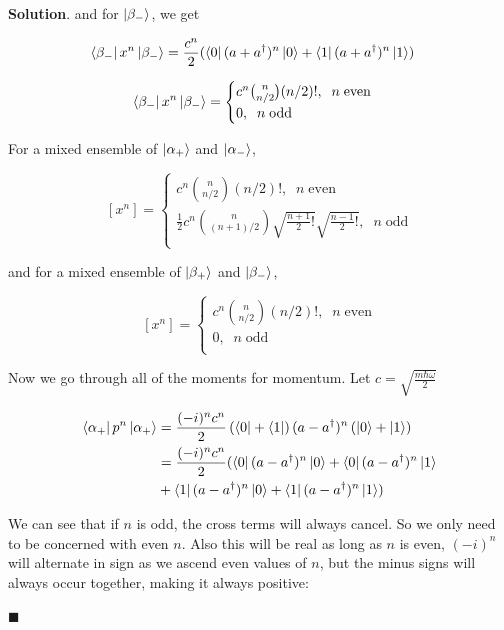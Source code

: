 \documentclass[12pt]{article}
\theoremstyle{definition}
\newenvironment{s}{%
        \begin{trivlist} \item \textbf{Solution}. }{%
            \hspace*{\fill} $\blacksquare$\end{trivlist}}%
\begin{document}
{\begin{s}
and for $\ket{\beta_{-}}$, we get

\begin{align*}
\bra{\beta_-}x^{n}\ket{\beta_-} &= \frac{c^{n}}{2}(\bra{0}(a+a^{\dagger})^{n}\ket{0} + \bra{1}(a+a^{\dagger})^{n}\ket{1})
\end{align*}

$$
\bra{\beta_-}x^{n}\ket{\beta_-}=
\begin{cases}
c^{n}{n\choose n/2}(n/2)!, \;\;n \;\mathrm{even} \\
0, \;\;n \;\mathrm{odd} \\
\end{cases}
$$

For a mixed ensemble of $\ket{\alpha_{+}}$ and $\ket{\alpha_{-}}$, 

$$
[x^{n}] =
\begin{cases}
c^{n}{n\choose n/2}(n/2)!, \;\;n \;\mathrm{even} \\
\frac{1}{2}c^{n}{n\choose (n+1)/2}\sqrt{\frac{n+1}{2}!}\sqrt{\frac{n-1}{2}!}, \;\;n \;\mathrm{odd} \\
\end{cases}
$$

and for a mixed ensemble of $\ket{\beta_{+}}$ and $\ket{\beta_{-}}$, 

$$
[x^{n}] =
\begin{cases}
c^{n}{n\choose n/2}(n/2)!, \;\;n \;\mathrm{even} \\
0, \;\;n \;\mathrm{odd} \\
\end{cases}
$$

Now we go through all of the moments for momentum. Let $c = \sqrt{\frac{m\hbar\omega}{2}}$

\begin{align*}
\bra{\alpha_+}p^{n}\ket{\alpha_+} &= \frac{(-i)^{n}c^{n}}{2}\left(\bra{0} + \bra{1}\right)(a-a^{\dagger})^{n}\left(\ket{0} + \ket{1}\right)\\
&= \frac{(-i)^{n}c^{n}}{2}(\bra{0}(a-a^{\dagger})^{n}\ket{0} + \bra{0}(a-a^{\dagger})^{n}\ket{1}\\
&+ \bra{1}(a-a^{\dagger})^{n}\ket{0} + \bra{1}(a-a^{\dagger})^{n}\ket{1})
\end{align*}

We can see that if $n$ is odd, the cross terms will always cancel. So we only need to be concerned with even $n$. Also this will be real as long as $n$ is even, $(-i)^{n}$ will alternate in sign as we ascend even values of $n$, but the minus signs will always occur together, making it always positive:


\end{s}}
\end{document}
